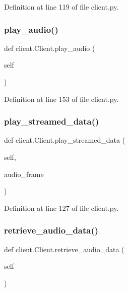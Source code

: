Definition at line 119 of file client.\+py.

\mbox{\label{classclient_1_1_client_ad422023bb1c71a266d1065cf270902e4}} 
\subsubsection{\texorpdfstring{play\_audio()}{play\_audio()}}
{\footnotesize\ttfamily def client.\+Client.\+play\+\_\+audio (\begin{DoxyParamCaption}\item[{}]{self }\end{DoxyParamCaption})}



Definition at line 153 of file client.\+py.

\mbox{\label{classclient_1_1_client_abbcdbabd70d9d67a2378f3412ae8f5db}} 
\subsubsection{\texorpdfstring{play\_streamed\_data()}{play\_streamed\_data()}}
{\footnotesize\ttfamily def client.\+Client.\+play\+\_\+streamed\+\_\+data (\begin{DoxyParamCaption}\item[{}]{self,  }\item[{}]{audio\+\_\+frame }\end{DoxyParamCaption})}



Definition at line 127 of file client.\+py.

\mbox{\label{classclient_1_1_client_aa136a25c0d00452c3ec1d229285f2e34}} 
\subsubsection{\texorpdfstring{retrieve\_audio\_data()}{retrieve\_audio\_data()}}
{\footnotesize\ttfamily def client.\+Client.\+retrieve\+\_\+audio\+\_\+data (\begin{DoxyParamCaption}\item[{}]{self }\end{DoxyParamCaption})}



